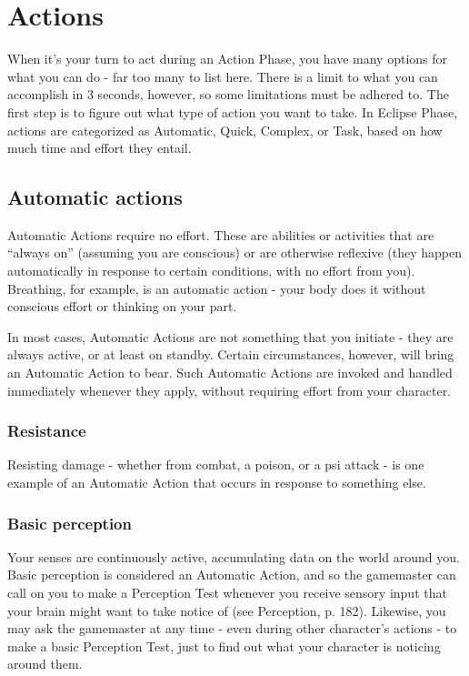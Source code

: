 \section{Actions}
\label{sec:actions}

When it’s your turn to act during an Action Phase, you have many options for what you can do - far too many to list here. There is a limit to what you can accomplish in 3 seconds, however, so some limitations must be adhered to. The first step is to figure out what type of action you want to take. In Eclipse Phase, actions are categorized as Automatic, Quick, Complex, or Task, based on how much time and effort they entail.


\subsection{Automatic actions}
\label{sec:combat-automatic-actions}

Automatic Actions require no effort. These are abilities or activities that are ``always on'' (assuming you are conscious) or are otherwise reflexive (they happen automatically in response to certain conditions, with no effort from you). Breathing, for example, is an automatic action - your body does it without conscious effort or thinking on your part.

In most cases, Automatic Actions are not something that you initiate - they are always active, or at least on standby. Certain circumstances, however, will bring an Automatic Action to bear. Such Automatic Actions are invoked and handled immediately whenever they apply, without requiring effort from your character.

\subsubsection{Resistance}

Resisting damage - whether from combat, a poison, or a psi attack - is one example of an Automatic Action that occurs in response to something else.

\subsubsection{Basic perception}

Your senses are continuously active, accumulating data on the world around you. Basic perception is considered an Automatic Action, and so the gamemaster can call on you to make a Perception Test whenever you receive sensory input that your brain might want to take notice of (see Perception, p. 182). Likewise, you may ask the gamemaster at any time - even during other character’s actions - to make a basic Perception Test, just to find out what your character is noticing around them.

